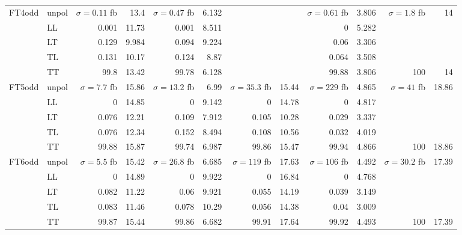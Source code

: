 \begin{table}[H]
{\begin{tabular}{llrrrrrrrrrr}
\midrule
\multirow{5}{*}{FT4odd}
 & unpol & $\sigma = \num{0.11}$ fb & \num{13.4} & $\sigma = \num{0.47}$ fb & \num{6.132} &  &  & $\sigma = \num{0.61}$ fb & \num{3.806} & $\sigma = \num{1.8}$ fb & \num{14} \\
 & LL & \num{0.001} & \num{11.73} & \num{0.001} & \num{8.511} &  &  & \num{0} & \num{5.282} &  &  \\
 & LT & \num{0.129} & \num{9.984} & \num{0.094} & \num{9.224} &  &  & \num{0.06} & \num{3.306} &  &  \\
 & TL & \num{0.131} & \num{10.17} & \num{0.124} & \num{8.87} &  &  & \num{0.064} & \num{3.508} &  &  \\
 & TT & \num{99.8} & \num{13.42} & \num{99.78} & \num{6.128} &  &  & \num{99.88} & \num{3.806} & \num{100} & \num{14} \\
\midrule
\multirow{5}{*}{FT5odd}
 & unpol & $\sigma = \num{7.7}$ fb & \num{15.86} & $\sigma = \num{13.2}$ fb & \num{6.99} & $\sigma = \num{35.3}$ fb & \num{15.44} & $\sigma = \num{229}$ fb & \num{4.865} & $\sigma = \num{41}$ fb & \num{18.86} \\
 & LL & \num{0} & \num{14.85} & \num{0} & \num{9.142} & \num{0} & \num{14.78} & \num{0} & \num{4.817} &  &  \\
 & LT & \num{0.076} & \num{12.21} & \num{0.109} & \num{7.912} & \num{0.105} & \num{10.28} & \num{0.029} & \num{3.337} &  &  \\
 & TL & \num{0.076} & \num{12.34} & \num{0.152} & \num{8.494} & \num{0.108} & \num{10.56} & \num{0.032} & \num{4.019} &  &  \\
 & TT & \num{99.88} & \num{15.87} & \num{99.74} & \num{6.987} & \num{99.86} & \num{15.47} & \num{99.94} & \num{4.866} & \num{100} & \num{18.86} \\
\midrule
\multirow{5}{*}{FT6odd}
 & unpol & $\sigma = \num{5.5}$ fb & \num{15.42} & $\sigma = \num{26.8}$ fb & \num{6.685} & $\sigma = \num{119}$ fb & \num{17.63} & $\sigma = \num{106}$ fb & \num{4.492} & $\sigma = \num{30.2}$ fb & \num{17.39} \\
 & LL & \num{0} & \num{14.89} & \num{0} & \num{9.922} & \num{0} & \num{16.84} & \num{0} & \num{4.768} &  &  \\
 & LT & \num{0.082} & \num{11.22} & \num{0.06} & \num{9.921} & \num{0.055} & \num{14.19} & \num{0.039} & \num{3.149} &  &  \\
 & TL & \num{0.083} & \num{11.46} & \num{0.078} & \num{10.29} & \num{0.056} & \num{14.38} & \num{0.04} & \num{3.009} &  &  \\
 & TT & \num{99.87} & \num{15.44} & \num{99.86} & \num{6.682} & \num{99.91} & \num{17.64} & \num{99.92} & \num{4.493} & \num{100} & \num{17.39} \\
\bottomrule
\end{tabular}
}%
\end{table}